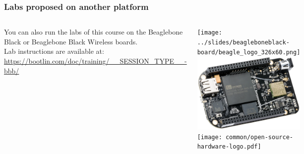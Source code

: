 \begin{frame}
\frametitle{Labs proposed on another platform}
  \begin{columns}
    You can also run the labs of this course on the Beaglebone Black
    or Beaglebone Black Wireless boards.\\
    \vspace{1em}
    Lab instructions are available at:\\
    {\small \url{https://bootlin.com/doc/training/__SESSION_TYPE__-bbb/}}
    \begin{center}
      \texttt{[image: ../slides/beagleboneblack-board/beagle\_logo\_326x60.png]}\\
      \includegraphics[width=\textwidth]{../slides/beagleboneblack-board/beagleboneblack.png}\\
      \texttt{[image: common/open-source-hardware-logo.pdf]}
    \end{center}
  \end{columns}
\end{frame}
